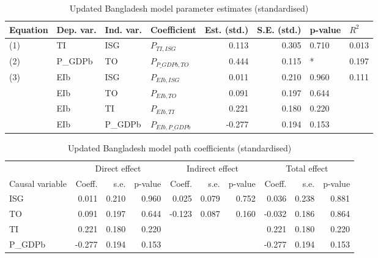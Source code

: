 \documentclass[11pt,a4paper]{article}
\begin{document}
\begin{table}[tbp]
\centering
\begin{adjustbox}{max width=\textwidth}
\begin{tabular}{llllrrll}
\toprule
Equation & Dep. var. & Ind. var. &        Coefficient &  Est. (std.) &  S.E. (std.) & p-value & $R^{2}$ \\
\midrule
     (1) &        TI &       ISG &       $P_{TI,ISG}$ &        0.113 &        0.305 &   0.710 &   0.013 \\
     (2) &   P\_GDPb &        TO &   $P_{P\_GDPb,TO}$ &        0.444 &        0.115 &       * &   0.197 \\
     (3) &       EIb &       ISG &      $P_{EIb,ISG}$ &        0.011 &        0.210 &   0.960 &   0.111 \\
         &       EIb &        TO &       $P_{EIb,TO}$ &        0.091 &        0.197 &   0.644 &         \\
         &       EIb &        TI &       $P_{EIb,TI}$ &        0.221 &        0.180 &   0.220 &         \\
         &       EIb &   P\_GDPb &  $P_{EIb,P\_GDPb}$ &       -0.277 &        0.194 &   0.153 &         \\
\bottomrule
\end{tabular}
\end{adjustbox}
\caption{Updated Bangladesh model parameter estimates (standardised)}
\label{tab:updated_estimates}
\end{table}

\begin{table}[tbp]
\centering
\begin{adjustbox}{max width=\textwidth}
\begin{tabular}{l|rrr|rrr|rrr}
\toprule
 				& \multicolumn{3}{c|}{Direct effect}  & \multicolumn{3}{c|}{Indirect effect} & \multicolumn{3}{c}{Total effect} \\
Causal variable & Coeff. & s.e. & p-value & Coeff. & s.e. & p-value & Coeff. & s.e. & p-value \\
\midrule
            ISG &     0.011 &   0.210 &      0.960 &     0.025 &   0.079 &      0.752 &     0.036 &   0.238 &      0.881 \\
             TO &     0.091 &   0.197 &      0.644 &    -0.123 &   0.087 &      0.160 &    -0.032 &   0.186 &      0.864 \\
             TI &     0.221 &   0.180 &      0.220 &           &         &            &     0.221 &   0.180 &      0.220 \\
        P\_GDPb &    -0.277 &   0.194 &      0.153 &           &         &            &    -0.277 &   0.194 &      0.153 \\
\bottomrule
\end{tabular}
\end{adjustbox}
\caption{Updated Bangladesh model path coefficients (standardised)}
\label{tab:updated_path_coeff}
\end{table}
\end{document}

